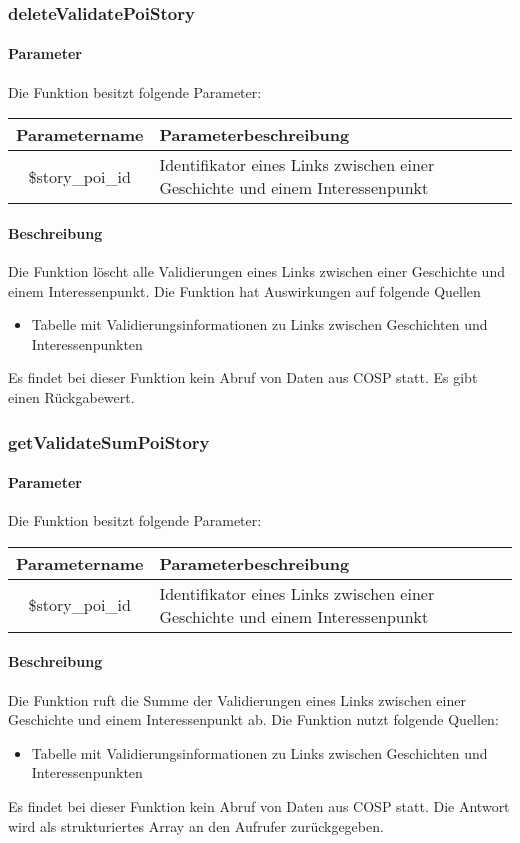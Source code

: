 \subsubsection{deleteValidatePoiStory}
\paragraph{Parameter} Die Funktion besitzt folgende Parameter:
\begin{table}[H]
	\begin{tabular}{|c|p{11cm}|}
		\hline
		\textbf{Parametername} & \textbf{Parameterbeschreibung} \\ \hline
		\$story\_poi\_id & Identifikator eines Links zwischen einer Geschichte und einem Interessenpunkt \\ \hline
	\end{tabular}
\end{table}
\paragraph{Beschreibung} Die Funktion löscht alle Validierungen eines Links zwischen einer Geschichte und einem Interessenpunkt. Die Funktion hat Auswirkungen auf folgende Quellen
\begin{itemize}
	\item Tabelle mit Validierungsinformationen zu Links zwischen Geschichten und Interessenpunkten
\end{itemize}
Es findet bei dieser Funktion kein Abruf von Daten aus {\glqq COSP\grqq} statt. Es gibt einen Rückgabewert.
\subsubsection{getValidateSumPoiStory}
\paragraph{Parameter} Die Funktion besitzt folgende Parameter:
\begin{table}[H]
	\begin{tabular}{|c|p{11cm}|}
		\hline
		\textbf{Parametername} & \textbf{Parameterbeschreibung} \\ \hline
		\$story\_poi\_id & Identifikator eines Links zwischen einer Geschichte und einem Interessenpunkt \\ \hline
	\end{tabular}
\end{table}
\paragraph{Beschreibung} Die Funktion ruft die Summe der Validierungen eines Links zwischen einer Geschichte und einem Interessenpunkt ab. Die Funktion nutzt folgende Quellen:
\begin{itemize}
	\item Tabelle mit Validierungsinformationen zu Links zwischen Geschichten und Interessenpunkten
\end{itemize}
Es findet bei dieser Funktion kein Abruf von Daten aus {\glqq COSP\grqq} statt. Die Antwort wird als strukturiertes Array an den Aufrufer zurückgegeben.
